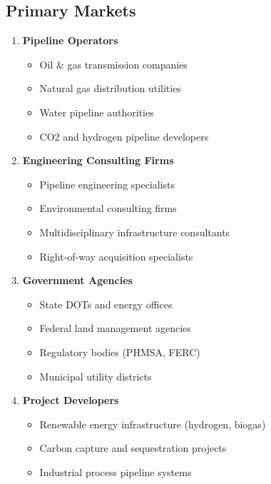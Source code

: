 \documentclass[11pt,letterpaper]{article}
\begin{document}
\subsection{Primary Markets}

\begin{enumerate}[leftmargin=*]
    \item \textbf{Pipeline Operators}
    \begin{itemize}
        \item Oil \& gas transmission companies
        \item Natural gas distribution utilities
        \item Water pipeline authorities
        \item CO2 and hydrogen pipeline developers
    \end{itemize}
    
    \item \textbf{Engineering Consulting Firms}
    \begin{itemize}
        \item Pipeline engineering specialists
        \item Environmental consulting firms
        \item Multidisciplinary infrastructure consultants
        \item Right-of-way acquisition specialists
    \end{itemize}
    
    \item \textbf{Government Agencies}
    \begin{itemize}
        \item State DOTs and energy offices
        \item Federal land management agencies
        \item Regulatory bodies (PHMSA, FERC)
        \item Municipal utility districts
    \end{itemize}
    
    \item \textbf{Project Developers}
    \begin{itemize}
        \item Renewable energy infrastructure (hydrogen, biogas)
        \item Carbon capture and sequestration projects
        \item Industrial process pipeline systems
    \end{itemize}
\end{enumerate}
\end{document}
